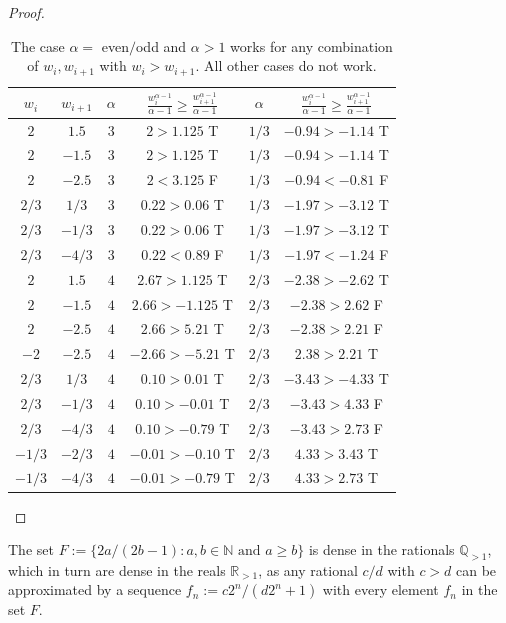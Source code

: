 \documentclass[pra,
aps,
twocolumn,
superscriptaddress,
groupedaddress,
nofootinbib,
reprint
]{revtex4-1}
\begin{document}
\begin{proof}
\begin{table}[h]
  \def\arraystretch{1.5}
  \centering
  \begin{tabular}{c|c|c|c||c|c}
    $w_i$ & $w_{i+1}$ & $\alpha$ & $\frac{w_i^{\alpha-1}}{\alpha-1} \geq \frac{w_{i+1}^{\alpha-1}}{\alpha-1}$ & $\alpha$ & $\frac{w_i^{\alpha-1}}{\alpha-1} \geq \frac{w_{i+1}^{\alpha-1}}{\alpha-1}$ \\[0.5ex]\hline
    $2$ & $1.5$  & $3$ & $2 > 1.125$ T & $1/3$ & $-0.94 > -1.14$ T \\
    $2$ & $-1.5$ & $3$ & $2 > 1.125$ T & $1/3$ & $-0.94 > -1.14$ T \\
    $2$ & $-2.5$ & $3$ & $2 < 3.125$ F & $1/3$ & $-0.94 < -0.81$ F \\[0.5ex]\hline
    $2/3$ & $1/3$  & $3$ & $0.22 > 0.06$ T & $1/3$ & $-1.97 > -3.12$ T \\
    $2/3$ & $-1/3$ & $3$ & $0.22 > 0.06$ T & $1/3$ & $-1.97 > -3.12$ T \\
    $2/3$ & $-4/3$ & $3$ & $0.22 < 0.89$ F & $1/3$ & $-1.97 < -1.24$ F \\[0.5ex]\hline
    $2$ & $1.5$  & $4$ & $2.67 > 1.125$ T & $2/3$ & $-2.38 > -2.62$ T \\
    $2$ & $-1.5$ & $4$ & $2.66 > -1.125$ T & $2/3$ & $-2.38 > 2.62$ F \\
    $2$ & $-2.5$ & $4$ & $2.66 > 5.21$ T & $2/3$ & $-2.38 > 2.21$ F \\
    $-2$ & $-2.5$ & $4$ & $-2.66 > -5.21$ T & $2/3$ & $2.38 > 2.21$ T \\[0.5ex]\hline
    $2/3$ & $1/3$  & $4$ & $0.10 > 0.01$ T & $2/3$ & $-3.43 > -4.33$ T \\
    $2/3$ & $-1/3$ & $4$ & $0.10 > -0.01$ T & $2/3$ & $-3.43 > 4.33$ F \\
    $2/3$ & $-4/3$ & $4$ & $0.10 > -0.79$ T & $2/3$ & $-3.43 > 2.73$ F \\
    $-1/3$ & $-2/3$ & $4$ & $-0.01 > -0.10$ T & $2/3$ & $4.33 > 3.43$ T \\
    $-1/3$ & $-4/3$ & $4$ & $-0.01 > -0.79$ T & $2/3$ & $4.33 > 2.73$ T
  \end{tabular}
  \caption{ The case $\alpha=$ even$/$odd and $\alpha > 1$ works for any combination of $w_i, w_{i+1}$ with $w_i > w_{i+1}$. 
  All other cases do not work.}
  \label{tab:test}
\end{table}

\end{proof}
The set $F := \{2a/(2b-1): a,b \in \mathbb{N} \text{ and } a \geq b\}$ is dense in the rationals $\mathbb{Q}_{>1}$, which in turn are dense in the reals $\mathbb{R}_{>1}$, as any rational $c/d$ with $c>d$ can be approximated by a sequence $f_n := c2^n / (d2^n+1)$ with every element $f_n$ in the set $F$. 
\end{document}
